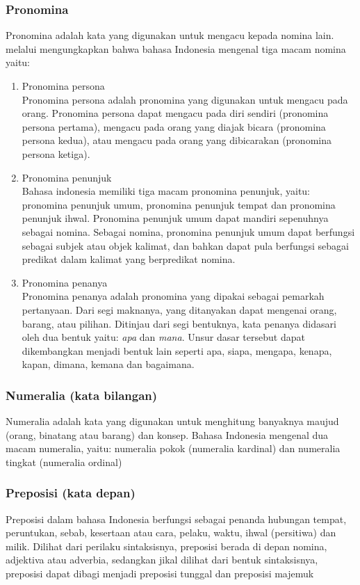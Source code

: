 \subsubsection{Pronomina}
Pronomina adalah kata yang digunakan untuk mengacu kepada nomina lain. \citet{alwi} melalui \citet{suryawan} mengungkapkan bahwa bahasa Indonesia mengenal tiga macam nomina yaitu:
\begin{enumerate}
	\item Pronomina persona\\
	Pronomina persona adalah pronomina yang digunakan untuk mengacu pada orang. Pronomina persona dapat mengacu pada diri sendiri (pronomina persona pertama), mengacu pada orang yang diajak bicara (pronomina persona kedua), atau mengacu pada orang yang dibicarakan (pronomina persona ketiga).

	\item Pronomina penunjuk\\
	Bahasa indonesia memiliki tiga macam pronomina penunjuk, yaitu: pronomina penunjuk umum, pronomina penunjuk tempat dan pronomina penunjuk ihwal. Pronomina penunjuk umum dapat mandiri sepenuhnya sebagai nomina. Sebagai nomina, pronomina penunjuk umum dapat berfungsi sebagai subjek atau objek kalimat, dan bahkan dapat pula berfungsi sebagai predikat dalam kalimat yang berpredikat nomina.

	\item Pronomina penanya\\
	Pronomina penanya adalah pronomina yang dipakai sebagai pemarkah pertanyaan. Dari segi maknanya, yang ditanyakan dapat mengenai orang, barang, atau pilihan. Ditinjau dari segi bentuknya, kata penanya didasari oleh dua bentuk yaitu: \emph{apa} dan \emph{mana}. Unsur dasar tersebut dapat dikembangkan menjadi bentuk lain seperti apa, siapa, mengapa, kenapa, kapan, dimana, kemana dan bagaimana.
\end{enumerate}

\subsubsection{Numeralia (kata bilangan)}
Numeralia adalah kata yang digunakan untuk menghitung banyaknya maujud (orang, binatang atau barang) dan konsep. Bahasa Indonesia mengenal dua macam numeralia, yaitu: numeralia pokok (numeralia kardinal) dan numeralia tingkat (numeralia ordinal) \citep{alwi}

\subsubsection{Preposisi (kata depan)}
Preposisi dalam bahasa Indonesia berfungsi sebagai penanda hubungan tempat, peruntukan, sebab, kesertaan atau cara, pelaku, waktu, ihwal (persitiwa) dan milik. Dilihat dari perilaku sintaksisnya, preposisi berada di depan nomina, adjektiva atau adverbia, sedangkan jikal dilihat dari bentuk sintaksisnya, preposisi dapat dibagi menjadi preposisi tunggal dan preposisi majemuk \citep{alwi}

